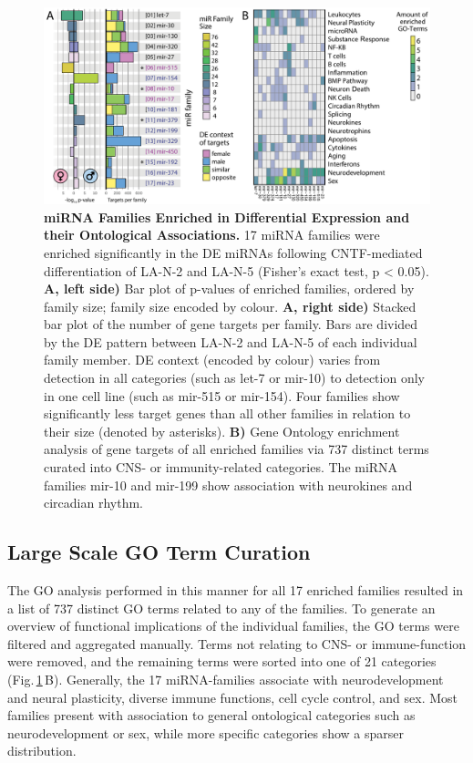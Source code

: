 \begin{figure}
\centering
\includegraphics[width=\textwidth]{figures/mir-de-fam-go}
\caption[Differential Expression miRNA Family Enrichment]{\textbf{miRNA Families Enriched in Differential Expression and their Ontological Associations.} 17 miRNA families were enriched significantly in the DE miRNAs following CNTF-mediated differentiation of LA-N-2 and LA-N-5 (Fisher's exact test, p < 0.05). \textbf{A, left side)} Bar plot of p-values of enriched families, ordered by family size; family size encoded by colour. \textbf{A, right side)} Stacked bar plot of the number of gene targets per family. Bars are divided by the DE pattern between LA-N-2 and LA-N-5 of each individual family member. DE context (encoded by colour) varies from detection in all categories (such as let-7 or mir-10) to detection only in one cell line (such as mir-515 or mir-154). Four families show significantly less target genes than all other families in relation to their size (denoted by asterisks). \textbf{B)} Gene Ontology enrichment analysis of gene targets of all enriched families via 737 distinct terms curated into CNS- or immunity-related categories. The miRNA families mir-10 and mir-199 show association with neurokines and circadian rhythm.
\label{fig:mir-de-fam-go}}
\end{figure}

\subsection{Large Scale GO Term Curation}
The GO analysis performed in this manner for all 17 enriched families resulted in a list of 737 distinct GO terms related to any of the families. To generate an overview of functional implications of the individual families, the GO terms were filtered and aggregated manually. Terms not relating to CNS- or immune-function were removed, and the remaining terms were sorted into one of 21 categories (Fig.\,\ref{fig:mir-de-fam-go}\,B). Generally, the 17 miRNA-families associate with neurodevelopment and neural plasticity, diverse immune functions, cell cycle control, and sex. Most families present with association to general ontological categories such as neurodevelopment or sex, while more specific categories show a sparser distribution.

